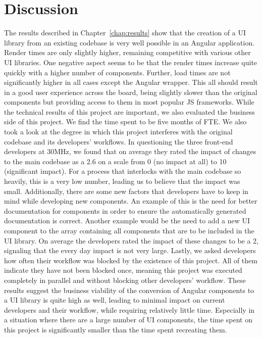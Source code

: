 \chapter{Discussion}\label{chap:discussion}

The results described in Chapter~\ref{chap:results} show that the creation of a UI library from an existing codebase is very well possible in an Angular application. Render times are only slightly higher, remaining competitive with various other UI libraries. One negative aspect seems to be that the render times increase quite quickly with a higher number of components. Further, load times are not significantly higher in all cases except the Angular wrapper. This all should result in a good user experience across the board, being slightly slower than the original components but providing access to them in most popular JS frameworks.
While the technical results of this project are important, we also evaluated the business side of this project. We find the time spent to be five months of FTE\@. We also took a look at the degree in which this project interferes with the original codebase and its developers' workflows. In questioning the three front-end developers at 30MHz, we found that on average they rated the impact of changes to the main codebase as a 2.6 on a scale from 0 (no impact at all) to 10 (significant impact). For a process that interlocks with the main codebase so heavily, this is a very low number, leading us to believe that the impact was small. Additionally, there are some new factors that developers have to keep in mind while developing new components. An example of this is the need for better documentation for components in order to ensure the automatically generated documentation is correct. Another example would be the need to add a new UI component to the array containing all components that are to be included in the UI library. On average the developers rated the impact of these changes to be a 2, signaling that the every day impact is not very large. Lastly, we asked developers how often their workflow was blocked by the existence of this project. All of them indicate they have not been blocked once, meaning this project was executed completely in parallel and without blocking other developers' workflow. These results suggest the business viability of the conversion of Angular components to a UI library is quite high as well, leading to minimal impact on current developers and their workflow, while requiring relatively little time. Especially in a situation where there are a large number of UI components, the time spent on this project is significantly smaller than the time spent recreating them.

